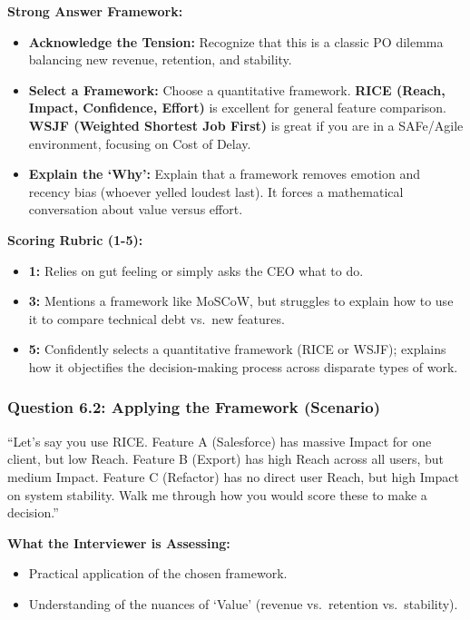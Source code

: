 \textbf{Strong Answer Framework:}

\begin{itemize}
\tightlist
\item
  \textbf{Acknowledge the Tension:} Recognize that this is a classic PO
  dilemma balancing new revenue, retention, and stability.
\item
  \textbf{Select a Framework:} Choose a quantitative framework.
  \textbf{RICE (Reach, Impact, Confidence, Effort)} is excellent for
  general feature comparison. \textbf{WSJF (Weighted Shortest Job
  First)} is great if you are in a SAFe/Agile environment, focusing on
  Cost of Delay.
\item
  \textbf{Explain the `Why':} Explain that a framework removes emotion
  and recency bias (whoever yelled loudest last). It forces a
  mathematical conversation about value versus effort.
\end{itemize}

\textbf{Scoring Rubric (1-5):}

\begin{itemize}
\tightlist
\item
  \textbf{1:} Relies on gut feeling or simply asks the CEO what to do.
\item
  \textbf{3:} Mentions a framework like MoSCoW, but struggles to explain
  how to use it to compare technical debt vs.~new features.
\item
  \textbf{5:} Confidently selects a quantitative framework (RICE or
  WSJF); explains how it objectifies the decision-making process across
  disparate types of work.
\end{itemize}

\subsubsection{Question 6.2: Applying the Framework
(Scenario)}\label{question-6.2-applying-the-framework-scenario}

``Let's say you use RICE. Feature A (Salesforce) has massive Impact for
one client, but low Reach. Feature B (Export) has high Reach across all
users, but medium Impact. Feature C (Refactor) has no direct user Reach,
but high Impact on system stability. Walk me through how you would score
these to make a decision.''

\textbf{What the Interviewer is Assessing:}

\begin{itemize}
\tightlist
\item
  Practical application of the chosen framework.
\item
  Understanding of the nuances of `Value' (revenue vs.~retention
  vs.~stability).
\end{itemize}

